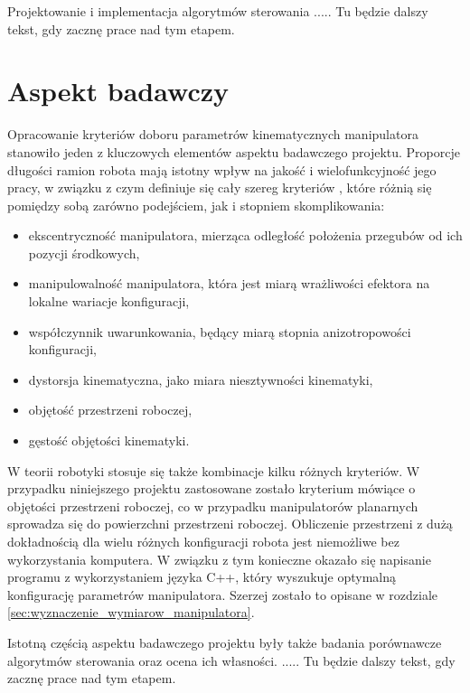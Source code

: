 \documentclass[printmode]{mgr}
\begin{document}
Projektowanie i implementacja algorytmów sterowania ..... Tu będzie dalszy tekst, gdy zacznę prace nad tym etapem.

\section{Aspekt badawczy}\label{sec:aspekt_badawczy}
Opracowanie kryteriów doboru parametrów kinematycznych manipulatora stanowiło jeden z kluczowych elementów aspektu badawczego projektu.
Proporcje długości ramion robota mają istotny wpływ na jakość i wielofunkcyjność jego pracy, w związku z czym definiuje się cały
szereg kryteriów \cite{miary_jakosci}, które różnią się pomiędzy sobą zarówno podejściem, jak i stopniem skomplikowania:
\begin{itemize}
\item ekscentryczność manipulatora, mierząca odległość położenia przegubów od ich pozycji środkowych,
\item manipulowalność manipulatora, która jest miarą wrażliwości efektora na lokalne wariacje konfiguracji,
\item współczynnik uwarunkowania, będący miarą stopnia anizotropowości konfiguracji,
\item dystorsja kinematyczna, jako miara niesztywności kinematyki,
\item objętość przestrzeni roboczej,
\item gęstość objętości kinematyki.
\end{itemize}
W teorii robotyki stosuje się także kombinacje kilku różnych kryteriów. W przypadku niniejszego projektu zastosowane zostało
kryterium mówiące o objętości przestrzeni roboczej, co w przypadku manipulatorów planarnych sprowadza się do powierzchni przestrzeni roboczej. 
Obliczenie przestrzeni z dużą dokładnością dla wielu różnych konfiguracji robota jest niemożliwe bez wykorzystania komputera. W związku
z tym konieczne okazało się napisanie programu z wykorzystaniem języka C++, który wyszukuje optymalną konfigurację parametrów manipulatora. 
Szerzej zostało to opisane w rozdziale \ref{sec:wyznaczenie_wymiarow_manipulatora}.

Istotną częścią aspektu badawczego projektu były także badania porównawcze algorytmów sterowania oraz ocena ich własności.
.....
Tu będzie dalszy tekst, gdy zacznę prace nad tym etapem.
\end{document}
